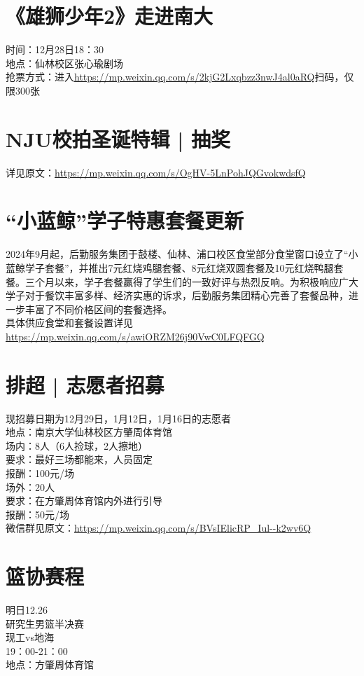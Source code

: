 \documentclass[letterpaper, 12pt]{article}
\begin{document}
\begin{multicols}{2}
\section{《雄狮少年2》走进南大}
时间：12月28日18：30\\
地点：仙林校区张心瑜剧场\\
抢票方式：进入\url{https://mp.weixin.qq.com/s/2kjG2Lxqbzz3nwJ4al0aRQ}扫码，仅限300张\\


\section{NJU校拍圣诞特辑 | 抽奖}
详见原文：\url{https://mp.weixin.qq.com/s/OgHV-5LnPohJQGvokwdsfQ}
\section{“小蓝鲸”学子特惠套餐更新}
2024年9月起，后勤服务集团于鼓楼、仙林、浦口校区食堂部分食堂窗口设立了“小蓝鲸学子套餐”，并推出7元红烧鸡腿套餐、8元红烧双圆套餐及10元红烧鸭腿套餐。三个月以来，学子套餐赢得了学生们的一致好评与热烈反响。为积极响应广大学子对于餐饮丰富多样、经济实惠的诉求，后勤服务集团精心完善了套餐品种，进一步丰富了不同价格区间的套餐选择。\\
具体供应食堂和套餐设置详见\url{https://mp.weixin.qq.com/s/awiORZM26j90VwC0LFQFGQ}
\section{排超 | 志愿者招募}
现招募日期为12月29日，1月12日，1月16日的志愿者\\
地点：南京大学仙林校区方肇周体育馆\\
场内：8人（6人捡球，2人擦地）\\
要求：最好三场都能来，人员固定\\
报酬：100元/场\\
场外：20人\\
要求：在方肇周体育馆内外进行引导\\
报酬：50元/场\\
微信群见原文：\url{https://mp.weixin.qq.com/s/BVsIElicRP_Iul--k2wv6Q}

\section{篮协赛程}
明日12.26\\
研究生男篮半决赛\\
现工vs地海\\
19：00-21：00\\
地点：方肇周体育馆


\end{multicols}
\end{document}
